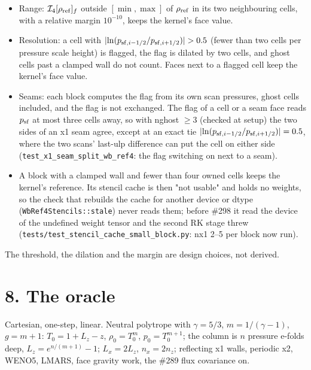 \documentclass[11pt,a4paper]{article}
\begin{document}
\begin{itemize}
\item Range: $\mathcal I_4[\rho_{\rm ref}]_f$ outside $[\min, \max]$ of $\rho_{\rm ref}$ in its two neighbouring cells,
  with a relative margin $10^{-10}$, keeps the kernel's face value.
\item Resolution: a cell with $\lvert\ln(p_{{\rm sf},i-1/2}/p_{{\rm sf},i+1/2})\rvert > 0.5$ (fewer than two cells per
  pressure scale height) is flagged, the flag is dilated by two cells, and ghost cells past a clamped wall do
  not count. Faces next to a flagged cell keep the kernel's face value.
\item Seams: each block computes the flag from its own scan pressures, ghost cells included, and the flag is not
  exchanged. The flag of a cell or a seam face reads $p_{\rm sf}$ at most three cells away, so with nghost
  $\ge 3$ (checked at setup) the two sides of an x1 seam agree, except at an exact tie
  $\lvert\ln(p_{{\rm sf},i-1/2}/p_{{\rm sf},i+1/2})\rvert = 0.5$, where the two scans' last-ulp difference can
  put the cell on either side (\texttt{test\_x1\_seam\_split\_wb\_ref4}: the flag switching on next to a seam).
\item A block with a clamped wall and fewer than four owned cells keeps the kernel's reference. Its stencil cache
  is then "not usable" and holds no weights, so the check that rebuilds the cache for another device or dtype
  (\texttt{WbRef4Stencils::stale}) never reads them; before \#298 it read the device of the undefined weight tensor and
  the second RK stage threw (\texttt{tests/test\_stencil\_cache\_small\_block.py}: nx1 2–5 per block now run).
\end{itemize}

The threshold, the dilation and the margin are design choices, not derived.

\section*{8. The oracle}

Cartesian, one-step, linear. Neutral polytrope with $\gamma = 5/3$, $m = 1/(\gamma-1)$, $g = m+1$:
$T_0 = 1 + L_z - z$, $\rho_0 = T_0^m$, $p_0 = T_0^{m+1}$; the column is $n$ pressure e-folds deep,
$L_z = e^{n/(m+1)} - 1$; $L_x = 2L_z$, $n_x = 2n_z$; reflecting x1 walls, periodic x2, WENO5, LMARS, face
gravity work, the \#289 flux covariance on.
\end{document}
